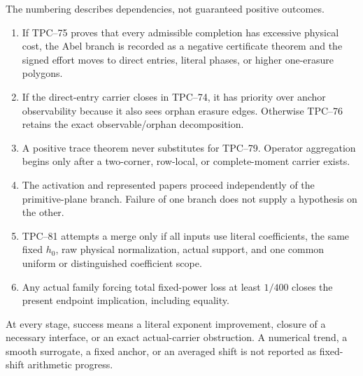 The numbering describes dependencies, not guaranteed positive outcomes.
\begin{enumerate}[label=\textup{(R\arabic*)},leftmargin=3.2em]
 \item If TPC--75 proves that every admissible completion has excessive
       physical cost, the Abel branch is recorded as a negative certificate
       theorem and the signed effort moves to direct entries, literal
       phases, or higher one-erasure polygons.
 \item If the direct-entry carrier closes in TPC--74, it has priority over
       anchor observability because it also sees orphan erasure edges.
       Otherwise TPC--76 retains the exact observable/orphan decomposition.
 \item A positive trace theorem never substitutes for TPC--79.  Operator
       aggregation begins only after a two-corner, row-local, or
       complete-moment carrier exists.
 \item The activation and represented papers proceed independently of the
       primitive-plane branch.  Failure of one branch does not supply a
       hypothesis on the other.
 \item TPC--81 attempts a merge only if all inputs use literal
       coefficients, the same fixed \(h_0\), raw physical normalization,
       actual support, and one common uniform or distinguished coefficient
       scope.
 \item Any actual family forcing total fixed-power loss at least \(1/400\)
       closes the present endpoint implication, including equality.
\end{enumerate}

At every stage, success means a literal exponent improvement, closure of a
necessary interface, or an exact actual-carrier obstruction.  A numerical
trend, a smooth surrogate, a fixed anchor, or an averaged shift is not
reported as fixed-shift arithmetic progress.
